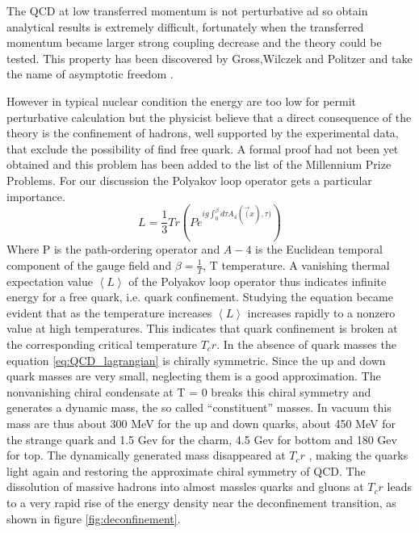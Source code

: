 \documentclass[12pt,a4paper]{book}
\begin{document}
	The QCD at low transferred momentum is not perturbative ad so obtain analytical results is extremely difficult, fortunately when the transferred momentum became larger strong coupling decrease and the theory could be tested. This property has been discovered by Gross,Wilczek and Politzer and take the name of asymptotic freedom \cite{DAVIDPOLITZER1974129}. %
	
	However in typical nuclear condition the energy are too low for permit perturbative calculation but the physicist believe that a direct consequence of the theory is the confinement of hadrons, well supported by the experimental data, that exclude the possibility of find free quark. A formal proof had not been yet obtained and this problem has been added to the list of the Millennium Prize Problems. For our discussion the Polyakov loop operator gets a particular importance. 
	\begin{equation}
		L=\frac{1}{3} Tr \left(P e^{ig \int_{0}^{\beta} d\tau A_4(\vec(x),\tau) } \right)
		\label{eq:Polyakov-loop}
	\end{equation}
	Where P is the path-ordering operator and $A-4$ is the Euclidean temporal component of the gauge field and $\beta= \frac{1}{T}$, T temperature. A vanishing thermal expectation value $\left<L\right>$ of the Polyakov loop operator thus indicates infinite energy for a free quark, i.e. quark confinement. Studying the equation became evident that as the temperature increases $\left<L\right>$ increases rapidly to a nonzero value at high temperatures. This indicates that quark confinement is broken at the corresponding critical temperature $T_cr$. In the absence of quark	masses the equation \ref{eq:QCD_lagrangian} is chirally symmetric. Since the up and down quark masses are very small, neglecting them is a good approximation. The nonvanishing chiral condensate at T = 0 breaks this chiral symmetry and generates a dynamic mass, the so called “constituent” masses. In vacuum this mass are thus about 300 MeV for the up and down quarks, about 450 MeV for the strange quark and 1.5 Gev for the charm, 4.5 Gev for bottom and 180 Gev for top. The dynamically generated mass disappeared at $T_cr$ , making the quarks light again and restoring the approximate chiral symmetry of QCD. The dissolution of massive hadrons into almost massles quarks and gluons at $T_cr$ leads to a very rapid rise of the energy density near the deconfinement transition, as shown in figure \ref{fig:deconfinement}.
\end{document}
